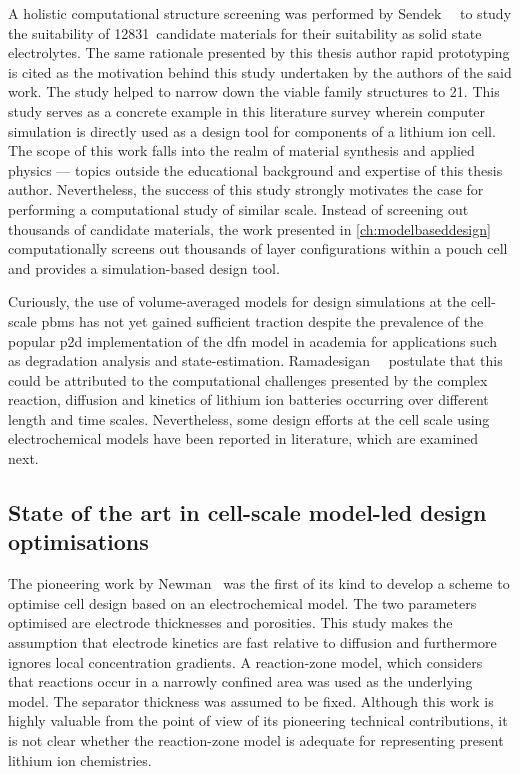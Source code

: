 A    holistic   computational    structure    screening    was   performed    by
Sendek~\etal~\cite{Sendek2017}  to  study  the  suitability  of  12831~candidate
materials for their suitability as  solid state electrolytes. The same rationale
presented  by  this thesis  author  \ie{}  rapid  prototyping  is cited  as  the
motivation behind  this study undertaken  by the authors  of the said  work. The
study  helped to  narrow down  the viable  family structures  to 21.  This study
serves  as  a  concrete  example  in this  literature  survey  wherein  computer
simulation is  directly used as  a design tool for  components of a  lithium ion
cell. The  scope of  this work falls  into the realm  of material  synthesis and
applied  physics ---  topics outside  the educational  background and  expertise
of  this  thesis  author.  Nevertheless,  the success  of  this  study  strongly
motivates  the case  for  performing  a computational  study  of similar  scale.
Instead of  screening out thousands  of candidate materials, the  work presented
in  \cref{ch:modelbaseddesign} computationally  screens out  thousands of  layer
configurations within a pouch cell and provides a simulation-based design tool.

Curiously,  the use  of volume-averaged  models  for design  simulations at  the
cell-scale  \glspl{pbm}  has not  yet  gained  sufficient traction  despite  the
prevalence of  the popular  \gls{p2d} implementation of  the \gls{dfn}  model in
academia  for applications  such as  degradation analysis  and state-estimation.
Ramadesigan~\etal~\cite{Ramadesigan2012} postulate that this could be attributed
to the  computational challenges  presented by  the complex  reaction, diffusion
and  kinetics of  lithium  ion  batteries occurring  over  different length  and
time  scales.  Nevertheless,  some  design  efforts  at  the  cell  scale  using
electrochemical  models have  been reported  in literature,  which are  examined
next.

\subsection{State of the art in cell-scale model-led design optimisations}

The pioneering  work by Newman~\cite{Newman1995}  was the  first of its  kind to
develop a scheme to optimise cell  design based on an electrochemical model. The
two parameters  optimised are electrode  thicknesses and porosities.  This study
makes the assumption that electrode kinetics  are fast relative to diffusion and
furthermore ignores local concentration  gradients. A reaction-zone model, which
considers  that reactions  occur in  a narrowly  confined area  was used  as the
underlying model. The separator thickness was assumed to be fixed. Although this
work  is highly  valuable from  the point  of view  of its  pioneering technical
contributions, it is  not clear whether the reaction-zone model  is adequate for
representing present lithium ion chemistries.

